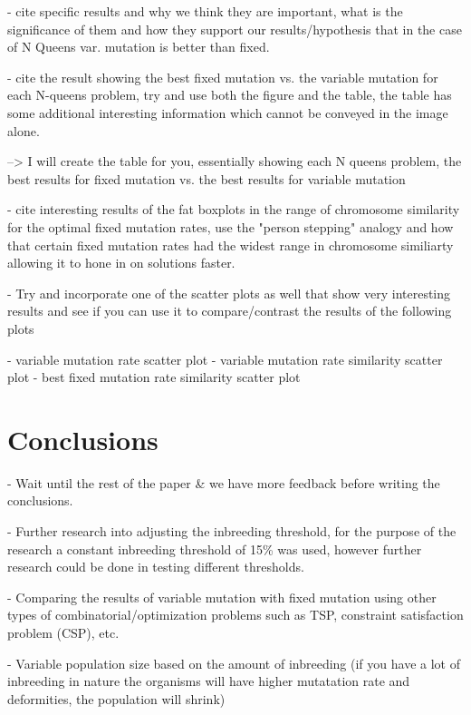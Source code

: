 \documentclass{sig-alternate}
\begin{document}
- cite specific results and why we think they are important, what is the significance
  of them and how they support our results/hypothesis that in the case of N Queens
  var. mutation is better than fixed.

- cite the result showing the best fixed mutation vs. the variable mutation
  for each N-queens problem, try and use both the figure and the table, the table
  has some additional interesting information which cannot be conveyed in the
  image alone.
  
  --> I will create the table for you, essentially showing each N queens problem, the
      best results for fixed mutation vs. the best results for variable mutation

- cite interesting results of the fat boxplots in the range of chromosome similarity
  for the optimal fixed mutation rates, use the "person stepping" analogy and how
  that certain fixed mutation rates had the widest range in chromosome similiarty
  allowing it to hone in on solutions faster.

- Try and incorporate one of the scatter plots as well that show very interesting
  results and see if you can use it to compare/contrast the results of the 
  following plots
  
    - variable mutation rate scatter plot
    - variable mutation rate similarity scatter plot
    - best fixed mutation rate similarity scatter plot




% 
%
\section{Conclusions}

- Wait until the rest of the paper \& we have more feedback before
  writing the conclusions.

- Further research into adjusting the inbreeding threshold, for the purpose
  of the research a constant inbreeding threshold of 15\% was used, however
  further research could be done in testing different thresholds.

- Comparing the results of variable mutation with fixed mutation using other
  types of combinatorial/optimization problems such as TSP, constraint
  satisfaction problem (CSP), etc.

- Variable population size based on the amount of inbreeding (if you have
  a lot of inbreeding in nature the organisms will have higher mutatation
  rate and deformities, the population will shrink)
\end{document}
